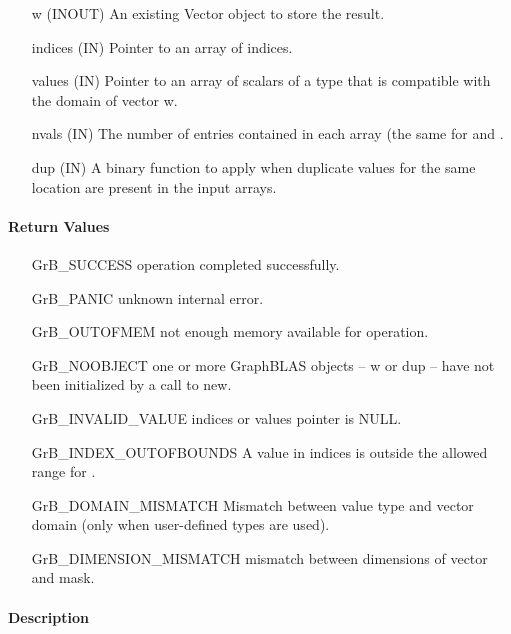 \begin{itemize}[leftmargin=1.1in]
    \item[{\sf w}]       ({\sf INOUT}) An existing Vector object to store the result.
    \item[{\sf indices}] ({\sf IN}) Pointer to an array of indices. 
    \item[{\sf values}]  ({\sf IN}) Pointer to an array of scalars of a type that
                                     is compatible with the domain of vector {\sf w}.
    \item[{\sf nvals}]   ({\sf IN}) The number of entries contained in each array (the same for  and .
    \item[{\sf dup}]     ({\sf IN}) A binary function to apply when duplicate values for
                         the same location are present in the input arrays.
\end{itemize}

\paragraph{Return Values}

\begin{itemize}[leftmargin=2.1in]
\item[{\sf GrB\_SUCCESS}]     operation completed successfully.
\item[{\sf GrB\_PANIC}]       unknown internal error.
\item[{\sf GrB\_OUTOFMEM}]    not enough memory available for operation.
\item[{\sf GrB\_NOOBJECT}]    one or more GraphBLAS objects -- {\sf w} or {\sf dup} -- 
                            have not been initialized by a call to {\sf new}.
\item[{\sf GrB\_INVALID\_VALUE}]  {\sf indices} or {\sf values} pointer is {\sf NULL}.
\item[{\sf GrB\_INDEX\_OUTOFBOUNDS}]
                            A value in {\sf indices} is outside the allowed range for .
\item[\sf GrB\_DOMAIN\_MISMATCH]  
                       Mismatch between value type and vector domain
                       (only when user-defined types are used).
\item[\sf GrB\_DIMENSION\_MISMATCH]  
                       mismatch between dimensions of vector and mask. 
\end{itemize}

\paragraph{Description}

